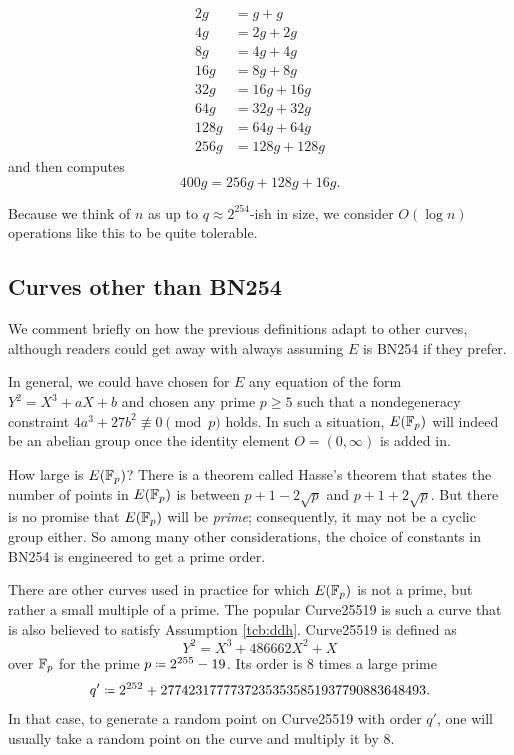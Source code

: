 \[\begin{aligned}
2g & = g + g \\
4g & = 2g + 2g \\
8g & = 4g + 4g \\
16g & = 8g + 8g \\
32g & = 16g + 16g \\
64g & = 32g + 32g \\
128g & = 64g + 64g \\
256g & = 128g + 128g
\end{aligned}\] and then computes \[400g = 256g + 128g + 16g.\]

Because we think of $n$ as up to $q \approx 2^{254}$-ish in size, we
consider $O( \log n )$ operations like this to be quite
tolerable.

\subsection{Curves other than BN254}
We comment briefly on how the previous definitions adapt to other
curves, although readers could get away with always assuming $E$ is
BN254 if they prefer.

In general, we could have chosen for $E$ any equation of the form
$Y^{2} = X^{3} + aX + b$ and chosen any prime $p \geq 5$ such that a
nondegeneracy constraint $4a^{3} + 27b^{2} \not \equiv 0 \pmod p$ holds.
In such a situation, $E( \mathbb{F}_{p} )$ will
indeed be an abelian group once the identity element $O = (0,\infty)$ is added in.

How large is $E( \mathbb{F}_{p} )$?
There is a theorem called Hasse's theorem
that states the number of points in $E( \mathbb{F}_{p} )$
is between $p + 1 - 2\sqrt{p}$ and $p + 1 + 2\sqrt{p}$. But there is
no promise that $E( \mathbb{F}_{p} )$ will be \emph{prime};
consequently, it may not be a cyclic group either.
So among many other considerations, the choice of constants in BN254 is
engineered to get a prime order.

There are other curves used in practice for which
$E( \mathbb{F}_{p} )$ is not a prime,
but rather a small multiple of a prime.
The popular Curve25519
is such a curve that is also believed to satisfy Assumption \ref{tcb:ddh}.
Curve25519 is defined as
\[ Y^{2} = X^{3} + 486662X^{2} + X \]
over $\mathbb{F}_{p}$ for the
prime $p \defeq 2^{255} - 19$. Its order is $8$ times a large prime
\[q' \defeq 2^{252} + 27742317777372353535851937790883648493. \]
In that case, to generate a random point on Curve25519 with order $q'$,
one will usually take a random point on the curve and multiply it by $8$.

